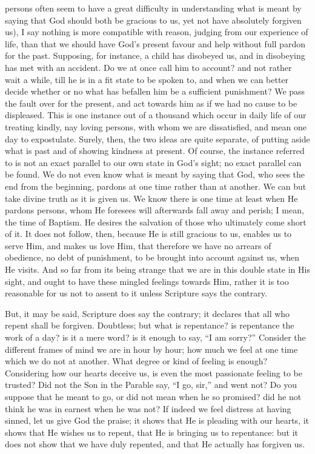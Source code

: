 persons often seem to have a great difficulty in understanding what is
meant by saying that God should both be gracious to us, yet not have
absolutely forgiven us), I say nothing is more compatible with reason,
judging from our experience of life, than that we should have God's
present favour and help without full pardon for the past. Supposing,
for instance, a child has disobeyed us, and in disobeying has met with
an accident. Do we at once call him to account? and not rather wait a
while, till he is in a fit state to be spoken to, and when we can
better decide whether or no what has befallen him be a sufficient
punishment? We pass the fault over for the present, and act towards
him as if we had no cause to be displeased. This is one instance out
of a thousand which occur in daily life of our treating kindly, nay
loving persons, with whom we are dissatisfied, and mean one day to
expostulate. Surely, then, the two ideas are quite separate, of
putting aside what is past and of showing kindness at present. Of
course, the instance referred to is not an exact parallel to our own
state in God's sight; no exact parallel can be found. We do not even
know what is meant by saying that God, who sees the end from the
beginning, pardons at one time rather than at another. We can but take
divine truth as it is given us. We know there is one time at least
when He pardons persons, whom He foresees will afterwards fall away
and perish; I mean, the time of Baptism. He desires the salvation of
those who ultimately come short of it. It does not follow, then,
because He is still gracious to us, enables us to serve Him, and makes
us love Him, that therefore we have no arrears of obedience, no debt
of punishment, to be brought into account against us, when He visits.
And so far from its being strange that we are in this double state in
His sight, and ought to have these mingled feelings towards Him,
rather it is too reasonable for us not to assent to it unless
Scripture says the contrary.

But, it may be said, Scripture does say the contrary; it declares
that all who repent shall be forgiven. Doubtless; but what is
repentance? is repentance the work of a day? is it a mere word? is it
enough to say, ``I am sorry?'' Consider the different frames
of mind we are in hour by hour; how much we feel at one time which we
do not at another. What degree or kind of feeling is enough?
Considering how our hearts deceive us, is even the most passionate
feeling to be trusted? Did not the Son in the Parable say, ``I go,
sir,'' and went not? Do you suppose that he meant to go, or did
not mean when he so promised? did he not think he was in earnest when
he was not? If indeed we feel distress at having sinned, let us give
God the praise; it shows that He is pleading with our hearts, it shows
that He wishes us to repent, that He is bringing us to repentance: but
it does not show that we have duly repented, and that He actually has
forgiven us.

